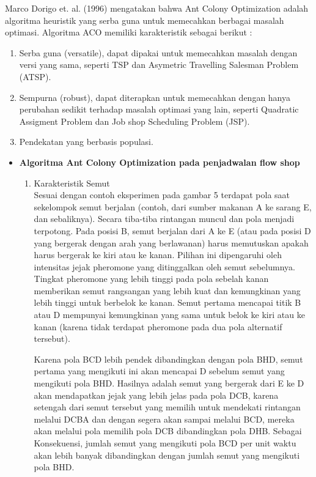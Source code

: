 \documentclass[a4paper,twoside]{article}
\begin{document}
\begin{enumerate}
\begin{itemize}
		Marco Dorigo et. al. (1996) mengatakan bahwa Ant Colony Optimization adalah algoritma heuristik yang serba guna untuk memecahkan berbagai masalah optimasi. Algoritma ACO memiliki karakteristik sebagai berikut :
		\begin{enumerate}
			\item Serba guna (versatile), dapat dipakai untuk memecahkan masalah dengan versi yang sama, seperti TSP dan Asymetric Travelling Salesman Problem (ATSP).
			\item Sempurna (robust), dapat diterapkan untuk memecahkan dengan hanya perubahan sedikit terhadap masalah optimasi yang lain, seperti Quadratic Assigment Problem dan Job shop Scheduling Problem (JSP).
			\item Pendekatan yang berbasis populasi.
		\end{enumerate}
		\end{itemize}	
		
		\begin{itemize}
		\item {\bf Algoritma Ant Colony Optimization pada penjadwalan flow shop}\\
		\begin{enumerate}
			\item Karakteristik Semut \\
				Sesuai dengan contoh eksperimen pada gambar 5 terdapat pola saat sekelompok semut berjalan (contoh, dari sumber makanan A ke sarang E, dan sebaliknya). Secara tiba-tiba rintangan muncul dan pola menjadi terpotong. Pada posisi B, semut berjalan dari A ke E (atau pada posisi D yang bergerak dengan arah yang berlawanan) harus memutuskan apakah harus bergerak ke kiri atau ke kanan.
			Pilihan ini dipengaruhi oleh intensitas jejak pheromone yang ditinggalkan oleh semut sebelumnya. Tingkat pheromone yang lebih tinggi pada pola sebelah kanan memberikan semut rangsangan yang lebih kuat dan kemungkinan yang lebih tinggi untuk berbelok ke kanan. Semut pertama mencapai titik B atau D mempunyai kemungkinan yang sama untuk belok ke kiri atau ke kanan (karena tidak terdapat pheromone pada dua pola alternatif tersebut).
			
			Karena pola BCD lebih pendek dibandingkan dengan pola BHD, semut pertama yang mengikuti ini akan mencapai D sebelum semut yang mengikuti pola BHD. Hasilnya adalah semut yang bergerak dari E ke D akan mendapatkan jejak yang lebih jelas pada pola DCB, karena setengah dari semut tersebut yang memilih untuk mendekati rintangan melalui DCBA dan dengan segera akan sampai melalui BCD, mereka akan melalui pola memilih pola DCB dibandingkan pola DHB. Sebagai Konsekuensi, jumlah semut yang mengikuti pola BCD per unit waktu akan lebih banyak dibandingkan dengan jumlah semut yang mengikuti pola BHD.
			

\end{enumerate}
\end{itemize}
\end{enumerate}
\end{document}

